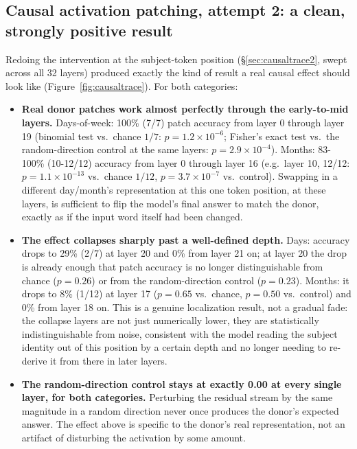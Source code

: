 \documentclass[11pt]{article}
\begin{document}
\subsection{Causal activation patching, attempt 2: a clean, strongly positive result}
\label{sec:causalresult}

Redoing the intervention at the subject-token position (\S\ref{sec:causaltrace2},
swept across all 32 layers) produced exactly the kind of result a real causal
effect should look like (Figure~\ref{fig:causaltrace}). For both categories:

\begin{itemize}
  \item \textbf{Real donor patches work almost perfectly through the early-to-mid
        layers.} Days-of-week: 100\% (7/7) patch accuracy from layer 0
        through layer 19 (binomial test vs.\ chance $1/7$: $p = 1.2 \times
        10^{-6}$; Fisher's exact test vs.\ the random-direction control at
        the same layers: $p = 2.9 \times 10^{-4}$). Months: 83-100\%
        (10-12/12) accuracy from layer 0 through layer 16 (e.g.\ layer 10,
        12/12: $p = 1.1 \times 10^{-13}$ vs.\ chance $1/12$, $p = 3.7 \times
        10^{-7}$ vs.\ control). Swapping in a different day/month's
        representation at this one token position, at these layers, is
        sufficient to flip the model's final answer to match the donor,
        exactly as if the input word itself had been changed.
  \item \textbf{The effect collapses sharply past a well-defined depth.} Days:
        accuracy drops to 29\% (2/7) at layer 20 and 0\% from layer 21 on;
        at layer 20 the drop is already enough that patch accuracy is no
        longer distinguishable from chance ($p = 0.26$) or from the
        random-direction control ($p = 0.23$). Months: it drops to 8\%
        (1/12) at layer 17 ($p = 0.65$ vs.\ chance, $p = 0.50$ vs.\ control)
        and 0\% from layer 18 on. This is a genuine localization result, not
        a gradual fade: the collapse layers are not just numerically lower,
        they are statistically indistinguishable from noise, consistent with
        the model reading the subject identity out of this position by a
        certain depth and no longer needing to re-derive it from there in
        later layers.
  \item \textbf{The random-direction control stays at exactly 0.00 at every
        single layer, for both categories.} Perturbing the residual stream by
        the same magnitude in a random direction never once produces the
        donor's expected answer. The effect above is specific to the donor's
        real representation, not an artifact of disturbing the activation by
        some amount.
\end{itemize}
\end{document}
